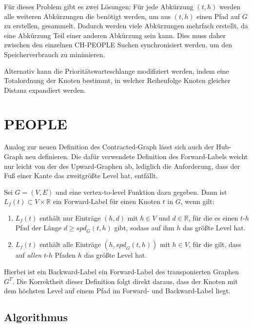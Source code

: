 Für dieses Problem gibt es zwei Lösungen:
Für jede Abkürzung $(t, h)$ werden alle weiteren Abkürzungen die benötigt werden, um aus $(t, h)$ einen Pfad auf $G$ zu erstellen, gesammelt.
Dadurch werden viele Abkürzungen mehrfach erstellt, da eine Abkürzung Teil einer anderen Abkürzung sein kann.
Dies muss daher zwischen den einzelnen CH-PEOPLE Suchen synchronisiert werden, um den Speicherverbrauch zu minimieren.

Alternativ kann die Prioritätswarteschlange modifiziert werden, indem eine Totalordnung der Knoten bestimmt, in welcher Reihenfolge Knoten gleicher Distanz expandiert werden.

\section{PEOPLE}

Analog zur neuen Definition des Contracted-Graph lässt sich auch der Hub-Graph neu definieren.
Die dafür verwendete Definition des Forward-Labels weicht nur leicht von der des Upward-Graphen ab, lediglich die Anforderung, dass der Fuß einer Kante das zweitgrößte Level hat, entfällt.

\begin{definition}
  Sei $G = (V, E)$ und eine vertex-to-level Funktion dazu gegeben.
  Dann ist $L_f (t) \subset V \times \mathbb{R}$ ein Forward-Label für einen Knoten $t$ in $G$, wenn gilt:

  \begin{enumerate}
    \item
          $L_f (t)$ enthält nur Einträge $(h, d)$ mit $h \in V$ und $d \in \mathbb{R}$, für die es einen $t$-$h$ Pfad der Länge $d \geq {spd}_G (t, h)$ gibt, sodass auf ihm $h$ das größte Level hat.

    \item
          $L_f (t)$ enthält alle Einträge $(h, {spd}_G (t, h))$ mit $h \in V$, für die gilt, dass auf \emph{allen} $t$-$h$ Pfaden $h$ das größte Level hat.
  \end{enumerate}
\end{definition}


Hierbei ist ein Backward-Label ein Forward-Label des transponierten Graphen $G^T$.
Die Korrektheit dieser Definition folgt direkt daraus, dass der Knoten mit dem höchsten Level auf einem Pfad im Forward- und Backward-Label liegt.

\subsection{Algorithmus}

